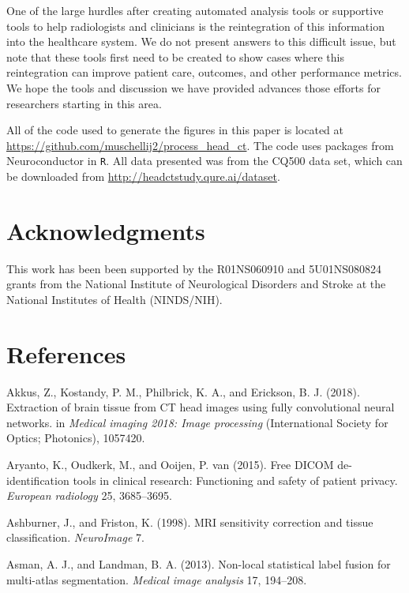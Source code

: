 \documentclass[utf8]{frontiersSCNS}
\begin{document}
One of the large hurdles after creating automated analysis tools or supportive tools to help radiologists and clinicians is the reintegration of this information into the healthcare system. We do not present answers to this difficult issue, but note that these tools first need to be created to show cases where this reintegration can improve patient care, outcomes, and other performance metrics. We hope the tools and discussion we have provided advances those efforts for researchers starting in this area.

All of the code used to generate the figures in this paper is located at \url{https://github.com/muschellij2/process_head_ct}. The code uses packages from Neuroconductor in \texttt{R}. All data presented was from the CQ500 data set, which can be downloaded from \url{http://headctstudy.qure.ai/dataset}.

\hypertarget{acknowledgments}{%
\section{Acknowledgments}\label{acknowledgments}}

This work has been been supported by the R01NS060910 and 5U01NS080824 grants from the National Institute of Neurological Disorders and Stroke at the National Institutes of Health (NINDS/NIH).

\hypertarget{references}{%
\section*{References}\label{references}}

\hypertarget{refs}{}
\leavevmode\hypertarget{ref-ct_bet}{}%
Akkus, Z., Kostandy, P. M., Philbrick, K. A., and Erickson, B. J. (2018). Extraction of brain tissue from CT head images using fully convolutional neural networks. in \emph{Medical imaging 2018: Image processing} (International Society for Optics; Photonics), 1057420.

\leavevmode\hypertarget{ref-aryanto2015free}{}%
Aryanto, K., Oudkerk, M., and Ooijen, P. van (2015). Free DICOM de-identification tools in clinical research: Functioning and safety of patient privacy. \emph{European radiology} 25, 3685--3695.

\leavevmode\hypertarget{ref-ashburner1998mri}{}%
Ashburner, J., and Friston, K. (1998). MRI sensitivity correction and tissue classification. \emph{NeuroImage} 7.

\leavevmode\hypertarget{ref-asman2013non}{}%
Asman, A. J., and Landman, B. A. (2013). Non-local statistical label fusion for multi-atlas segmentation. \emph{Medical image analysis} 17, 194--208.
\end{document}
